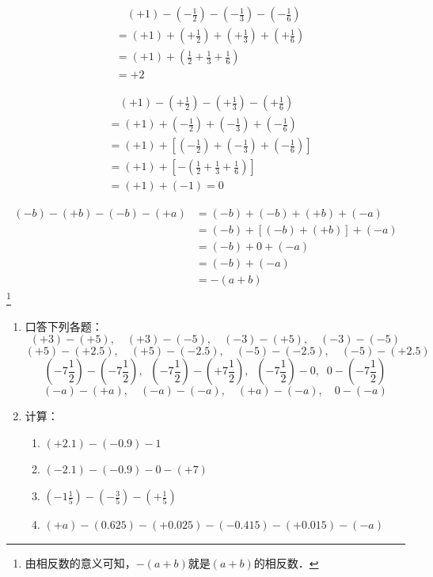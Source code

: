 \begin{solution}
	\begin{align*}
	&\quad   (+1)-\left(-\frac{1}{2}\right)-\left(-\frac{1}{3}\right)-\left(-\frac{1}{6}\right)\\
	&= (+1)+\left(+\frac{1}{2}\right)+\left(+\frac{1}{3}\right)+\left(+\frac{1}{6}\right)\tag{减法法则}\\
	&=(+1)+\left(\frac{1}{2}+\frac{1}{3}+\frac{1}{6}\right)\tag{同号相加法则}\\
	&=+2
	\end{align*}   
	
	\begin{align*}
	&\quad    (+1)-\left(+\frac{1}{2}\right)-\left(+\frac{1}{3}\right)-\left(+\frac{1}{6}\right)\\
	&=(+1)+\left(-\frac{1}{2}\right)+\left(-\frac{1}{3}\right)+\left(-\frac{1}{6}\right)\tag{减法法则}\\
	&=(+1)+\left[ \left(-\frac{1}{2}\right)+\left(-\frac{1}{3}\right) +\left(-\frac{1}{6}\right)\right]  \tag{加法结合律}\\
	&=(+1)+\left[-\left(\frac{1}{2}+\frac{1}{3}+\frac{1}{6}\right)\right]\tag{同号相加法则}  \\
	&=(+1)+(-1)=0  \tag{相反数性质}
	\end{align*}   
	
	\begin{align*}
	(-b)-(+b)-(-b)-(+a)&=(-b)+(-b)+(+b)+(-a)\tag{减法法则}\\
	&=(-b)+[(-b)+(+b)]+(-a)  \tag{加法结合律}\\
	&=(-b)+0+(-a) \tag{相反数意义}\\
	&=(-b)+(-a) \tag{零的特征}\\
	&=-(a+b)  \tag{同号相加法则}
	\end{align*}\footnote{由相反数的意义可知，$-(a+b)$就是$(a+b)$的相反数．}
\end{solution}

\begin{ex}
	\begin{enumerate}
		\item 口答下列各题：
		\[(+3)-(+5),\quad (+3)-(-5),\quad (-3)-(+5),\quad (-3)-(-5) \]
		\[(+5)-(+2.5),\quad  (+5)-(-2.5),\quad (-5)-(-2.5),\quad (-5)-(+2.5)\]
		\[\left(-7\frac{1}{2}\right)-\left(-7\frac{1}{2}\right),\;\; \left(-7\frac{1}{2}\right)-\left(+7\frac{1}{2}\right),\;\; \left(-7\frac{1}{2}\right)-0,\;\; 0-\left(-7\frac{1}{2}\right) \]
		\[(-a)-(+a),\quad (-a)-(-a),\quad (+a)-(-a),\quad 0-(-a)\]
		
		\item 计算：
		\begin{enumerate}
			\item $(+2.1)-(-0.9)-1$
			\item $(-2.1)-(-0.9)-0-(+7)$
			\item $\left(-1\frac{1}{5}\right)-\left(-\frac{3}{5}\right)-\left(+\frac{1}{5}\right)$
			\item $(+a)-(0.625)-(+0.025)-(-0.415)-(+0.015)-(-a)$
		\end{enumerate}
	\end{enumerate}  
\end{ex}

